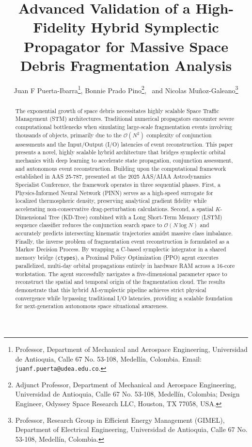 \documentclass[letterpaper, preprint, 11pt]{AAS}
\begin{document}
\title{Advanced Validation of a High-Fidelity Hybrid Symplectic Propagator for Massive Space Debris Fragmentation Analysis}

\author{Juan F Puerta-Ibarra\thanks{Professor, Department of Mechanical and Aerospace Engineering, Universidad de Antioquia, Calle 67 No. 53-108, Medellín, Colombia. Email: \texttt{juanf.puerta@udea.edu.co}.},  
Bonnie Prado Pino\thanks{Adjunct Professor, Department of Mechanical and Aerospace Engineering, Universidad de Antioquia, Calle 67 No. 53-108, Medellín, Colombia; Design Engineer, Odyssey Space Research LLC, Houston, TX 77058, USA.},
\ and Nicolas Muñoz-Galeano\thanks{Professor, Research Group in Efficient Energy Management (GIMEL), Department of Electrical Engineering, Universidad de Antioquia, Calle 67 No. 53-108, Medellín, Colombia.}
}

\maketitle

\begin{abstract}
The exponential growth of space debris necessitates highly scalable Space Traffic Management (STM) architectures. Traditional numerical propagators encounter severe computational bottlenecks when simulating large-scale fragmentation events involving thousands of objects, primarily due to the $\mathcal{O}(N^2)$ complexity of conjunction assessments and the Input/Output (I/O) latencies of event reconstruction. This paper presents a novel, highly scalable hybrid architecture that bridges symplectic orbital mechanics with deep learning to accelerate state propagation, conjunction assessment, and autonomous event reconstruction. Building upon the computational framework established in AAS 25-787, presented at the 2025 AAS/AIAA Astrodynamics Specialist Conference, the framework operates in three sequential phases. First, a Physics-Informed Neural Network (PINN) serves as a high-speed surrogate for localized thermospheric density, preserving analytical gradient fidelity while accelerating non-conservative drag-perturbation calculations. Second, a spatial $K$-Dimensional Tree (KD-Tree) combined with a Long Short-Term Memory (LSTM) sequence classifier reduces the conjunction search space to $\mathcal{O}(N \log N)$ and accurately predicts intersecting kinematic trajectories amidst massive class imbalance. Finally, the inverse problem of fragmentation event reconstruction is formulated as a Markov Decision Process. By wrapping a C-based symplectic integrator in a shared memory bridge (\texttt{ctypes}), a Proximal Policy Optimization (PPO) agent executes parallelized, multi-day orbital propagations entirely in hardware RAM across a 16-core workstation. The agent successfully navigates a five-dimensional parameter space to reconstruct the spatial and temporal origin of the fragmentation cloud. The results demonstrate that this hybrid AI-symplectic pipeline achieves strict physical convergence while bypassing traditional I/O latencies, providing a scalable foundation for next-generation autonomous space situational awareness.
\end{abstract}
\end{document}
